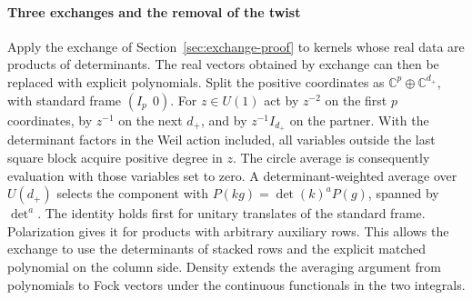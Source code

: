 \paragraph{Three exchanges and the removal of the twist}
Apply the exchange of Section~\ref{sec:exchange-proof} to kernels whose real
data are products of determinants. The real vectors obtained by exchange
can then be replaced with explicit polynomials. Split the positive coordinates
as \(\mathbb C^p\oplus\mathbb C^{d_+}\), with standard frame \((I_p\ \ 0)\).
For \(z\in U(1)\) act by \(z^{-2}\) on the first \(p\) coordinates,
by \(z^{-1}\) on the next \(d_+\), and by \(z^{-1}I_{d_+}\) on the partner.
With the determinant factors in the Weil action included, all variables
outside the last square block acquire positive degree in \(z\). The circle
average is consequently evaluation with those variables set to zero.
A determinant-weighted average over \(U(d_+)\) selects the component with
\(P(kg)=\det(k)^aP(g)\), spanned by \(\det^a\).
The identity holds first for unitary translates of the standard frame.
Polarization gives it for products with arbitrary auxiliary rows.
This allows the exchange to use the determinants of stacked rows and the
explicit matched polynomial on the column side. Density extends the
averaging argument from polynomials to Fock vectors under the continuous
functionals in the two integrals.

